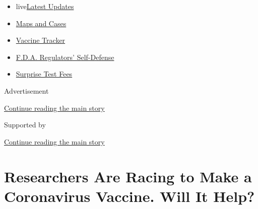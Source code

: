 \begin{itemize}
\tightlist
\item
  live\href{https://www.nytimes3xbfgragh.onion/2020/09/11/world/covid-19-coronavirus.html?name=styln-coronavirus-national\&region=TOP_BANNER\&block=storyline_menu_recirc\&action=click\&pgtype=Article\&impression_id=92efbf01-f4cd-11ea-a9ee-334f178d1f9e\&variant=undefined}{Latest
  Updates}
\item
  \href{https://www.nytimes3xbfgragh.onion/interactive/2020/us/coronavirus-us-cases.html?name=styln-coronavirus-national\&region=TOP_BANNER\&block=storyline_menu_recirc\&action=click\&pgtype=Article\&impression_id=92efbf02-f4cd-11ea-a9ee-334f178d1f9e\&variant=undefined}{Maps
  and Cases}
\item
  \href{https://www.nytimes3xbfgragh.onion/interactive/2020/science/coronavirus-vaccine-tracker.html?name=styln-coronavirus-national\&region=TOP_BANNER\&block=storyline_menu_recirc\&action=click\&pgtype=Article\&impression_id=92efbf03-f4cd-11ea-a9ee-334f178d1f9e\&variant=undefined}{Vaccine
  Tracker}
\item
  \href{https://www.nytimes3xbfgragh.onion/2020/09/10/us/politics/fda-coronavirus-vaccine.html?name=styln-coronavirus-national\&region=TOP_BANNER\&block=storyline_menu_recirc\&action=click\&pgtype=Article\&impression_id=92efbf04-f4cd-11ea-a9ee-334f178d1f9e\&variant=undefined}{F.D.A.
  Regulators' Self-Defense}
\item
  \href{https://www.nytimes3xbfgragh.onion/2020/09/09/upshot/coronavirus-surprise-test-fees.html?name=styln-coronavirus-national\&region=TOP_BANNER\&block=storyline_menu_recirc\&action=click\&pgtype=Article\&impression_id=92efbf05-f4cd-11ea-a9ee-334f178d1f9e\&variant=undefined}{Surprise
  Test Fees}
\end{itemize}

Advertisement

\protect\hyperlink{after-top}{Continue reading the main story}

Supported by

\protect\hyperlink{after-sponsor}{Continue reading the main story}

\hypertarget{researchers-are-racing-to-make-a-coronavirus-vaccine-will-it-help}{%
\section{Researchers Are Racing to Make a Coronavirus Vaccine. Will It
Help?}\label{researchers-are-racing-to-make-a-coronavirus-vaccine-will-it-help}}

